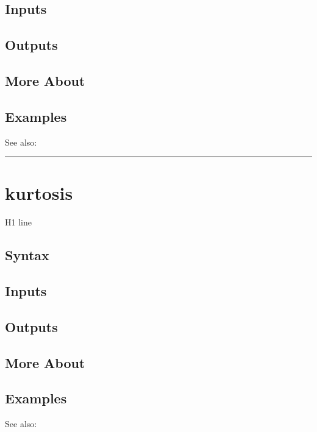 \documentclass[letterpaper,10pt,english]{sphinxmanual}
\begin{document}
\subsection{Inputs}
\label{classes/time_series/@ts/ts:id315}

\subsection{Outputs}
\label{classes/time_series/@ts/ts:id316}

\subsection{More About}
\label{classes/time_series/@ts/ts:id317}

\subsection{Examples}
\label{classes/time_series/@ts/ts:id318}
See also:


\bigskip\hrule{}\bigskip



\section{kurtosis}
\label{classes/time_series/@ts/ts:kurtosis}\label{classes/time_series/@ts/ts:id319}
H1 line


\subsection{Syntax}
\label{classes/time_series/@ts/ts:id320}

\subsection{Inputs}
\label{classes/time_series/@ts/ts:id321}

\subsection{Outputs}
\label{classes/time_series/@ts/ts:id322}

\subsection{More About}
\label{classes/time_series/@ts/ts:id323}

\subsection{Examples}
\label{classes/time_series/@ts/ts:id324}
See also:
\end{document}
